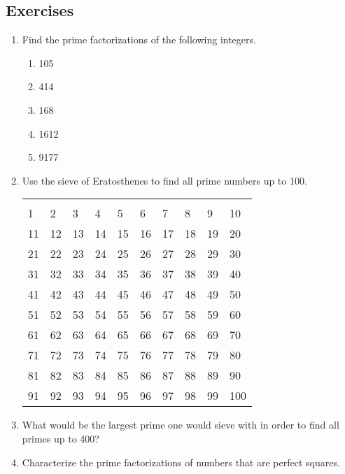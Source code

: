 \documentclass[10pt,]{book}
\theoremstyle{plain}
\theoremstyle{definition}
\theoremstyle{definition}
\numberwithin{equation}{section}
\newcommand{\hint}[1]{ }
\begin{document}
\subsection[{Exercises}]{Exercises}\label{exercises-2}
\leavevmode%
\begin{enumerate}[label=(\alph*)]
\item\hypertarget{li-20}{}
    Find the prime factorizations of the following integers.

\begin{enumerate}[label=\roman*.]
\item\hypertarget{li-21}{}
          105
\item\hypertarget{li-22}{}
          414
\item\hypertarget{li-23}{}
          168
\item\hypertarget{li-24}{}
          1612
\item\hypertarget{li-25}{}
          9177
\end{enumerate}

\item\hypertarget{li-26}{}
        Use the sieve of Eratosthenes to find all prime numbers
        up to 100.
        \begin{tabular}{llllllllll}
&&&&&&&&&\tabularnewline[0pt]
1&2&3&4&5&6&7&8&9&10\tabularnewline[0pt]
11&12&13&14&15&16&17&18&19&20\tabularnewline[0pt]
21&22&23&24&25&26&27&28&29&30\tabularnewline[0pt]
31&32&33&34&35&36&37&38&39&40\tabularnewline[0pt]
41&42&43&44&45&46&47&48&49&50\tabularnewline[0pt]
51&52&53&54&55&56&57&58&59&60\tabularnewline[0pt]
61&62&63&64&65&66&67&68&69&70\tabularnewline[0pt]
71&72&73&74&75&76&77&78&79&80\tabularnewline[0pt]
81&82&83&84&85&86&87&88&89&90\tabularnewline[0pt]
91&92&93&94&95&96&97&98&99&100
\end{tabular}

        \hint{The primes used in this instance of the sieve are just 2, 3, 5 and 7. Any number less than 100 that isn't a multiple of 2, 3, 5 or 7 will not be crossed off during the sieving process. If you're still unclear about the process, try a web search for \lstinline?"Sieve of Eratosthenes" +applet?, there are several interactive applets that will help you to understand how to sieve.
        }
\item\hypertarget{li-27}{}
        What would be the largest prime one would sieve with
        in order to find all primes up to 400?

        \hint{Remember that if a number factors into two multiplicands, the smaller of them will be less than the square root of the original number.}
\item\hypertarget{li-28}{}
        Characterize the prime factorizations of numbers that are
          perfect squares.




\end{enumerate}
\end{document}
